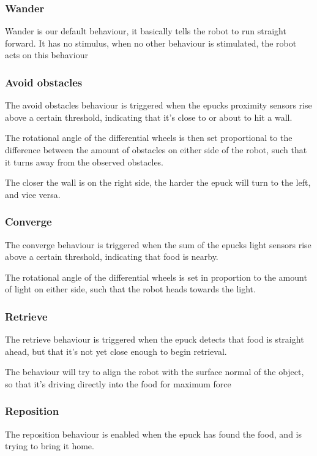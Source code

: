 \documentclass[a4paper]{article}
\begin{document}
\subsubsection{Wander}
Wander is our default behaviour, it basically tells the robot to run straight forward.
It has no stimulus, when no other behaviour is stimulated, the robot acts on this behaviour

\subsubsection{Avoid obstacles}
The avoid obstacles behaviour is triggered when the epucks proximity sensors rise above a certain threshold, indicating that it's close to or about to hit a wall.

The rotational angle of the differential wheels is then set proportional to the difference between the amount of obstacles on either side of the robot, such that it turns away from the observed obstacles.

The closer the wall is on the right side, the harder the epuck will turn to the left, and vice versa.

\subsubsection{Converge}
The converge behaviour is triggered when the sum of the epucks light sensors rise above a certain threshold, indicating that food is nearby.

The rotational angle of the differential wheels is set in proportion to the amount of light on either side, such that the robot heads towards the light.

\subsubsection{Retrieve}
The retrieve behaviour is triggered when the epuck detects that food is straight ahead, but that it's not yet close enough to begin retrieval.

The behaviour will try to align the robot with the surface normal of the object, so that it's driving directly into the food for maximum force

\subsubsection{Reposition}
The reposition behaviour is enabled when the epuck has found the food, and is trying to bring it home.
\end{document}
